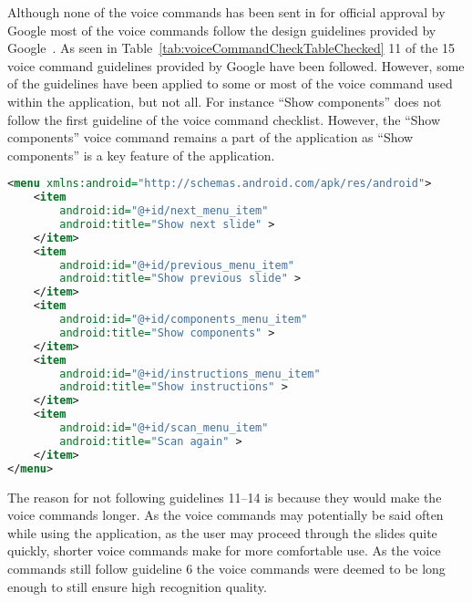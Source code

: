 Although none of the voice commands has been sent in for official approval by Google most of the voice commands follow the design guidelines provided by Google~\cite{glassVoiceChecklist}. As seen in Table~\ref{tab:voiceCommandCheckTableChecked} 11 of the 15 voice command guidelines provided by Google have been followed. However, some of the guidelines have been applied to some or most of the voice command used within the application, but not all. For instance ``Show components'' does not follow the first guideline of the voice command checklist. However, the ``Show components'' voice command remains a part of the application as ``Show components'' is a key feature of the application.

\newpage
\begin{lstlisting}[language=XML, caption={The voice command menu XML file}, label=voiceCommandXML]
<menu xmlns:android="http://schemas.android.com/apk/res/android">
	<item
		android:id="@+id/next_menu_item"
		android:title="Show next slide" >
	</item>
	<item
		android:id="@+id/previous_menu_item"
		android:title="Show previous slide" >
	</item>
	<item
		android:id="@+id/components_menu_item"
		android:title="Show components" >
	</item>
	<item
		android:id="@+id/instructions_menu_item"
		android:title="Show instructions" >
	</item>
	<item
		android:id="@+id/scan_menu_item"
		android:title="Scan again" >
	</item>
</menu>
\end{lstlisting}



The reason for not following guidelines 11--14 is because they would make the voice commands longer. As the voice commands may potentially be said often while using the application, as the user may proceed through the slides quite quickly, shorter voice commands make for more comfortable use. As the voice commands still follow guideline 6 the voice commands were deemed to be long enough to still ensure high recognition quality.